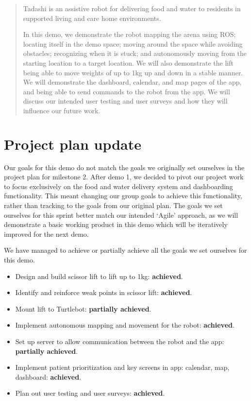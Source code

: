 \documentclass{article}
\begin{document}
 


\begin{abstract}
  Tadashi is an assistive robot for delivering food and water to residents in supported living and care home environments.

  In this demo, we demonstrate the robot mapping the arena using ROS; locating itself in the demo space; moving around the space while avoiding obstacles; recognizing when it is stuck; and autonomously moving from the starting location to a target location. We will also demonstrate the lift being able to move weights of up to 1kg up and down in a stable manner. We will demonstrate the dashboard, calendar, and map pages of the app, and being able to send commands to the robot from the app. We will discuss our intended user testing and user surveys and how they will influence our future work.
\end{abstract} 

\section{Project plan update}
Our goals for this demo do not match the goals we originally set ourselves in the project plan for milestone 2. After demo 1, we decided to pivot our project work to focus exclusively on the food and water delivery system and dashboarding functionality. This meant changing our group goals to achieve this functionality, rather than tracking to the goals from our original plan. The goals we set ourselves for this sprint better match our intended `Agile' approach, as we will demonstrate a basic working product in this demo which will be iteratively improved for the next demo.

We have managed to achieve or partially achieve all the goals we set ourselves for this demo.
\begin{itemize}
\item Design and build scissor lift to lift up to 1kg: {\bf achieved}.
\item Identify and reinforce weak points in scissor lift: {\bf achieved}.
\item Mount lift to Turtlebot: {\bf partially achieved}.
\item Implement autonomous mapping and movement for the robot: {\bf achieved}.
\item Set up server to allow communication between the robot and the app: {\bf partially achieved}. 
\item Implement patient prioritization and key screens in app: calendar, map, dashboard: {\bf achieved}.
\item Plan out user testing and user surveys: {\bf achieved}.
\end{itemize}
\end{document}
